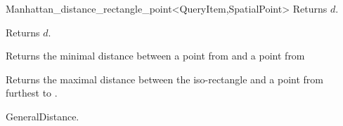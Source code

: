 \begin{ccRefClass}{Manhattan_distance_rectangle_point<QueryItem,SpatialPoint>}
 {Returns $d$.}

 {Returns $d$.}


{Returns the minimal distance between a point from  and a point from
}

{Returns the maximal distance between the iso-rectangle  and
a point from  furthest to .}


\ccSeeAlso

GeneralDistance.

\end{ccRefClass}


